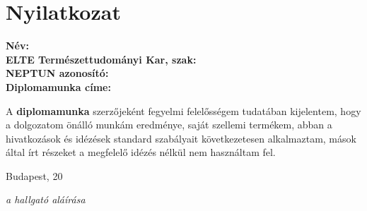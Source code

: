 \documentclass[a4paper,12pt]{report}
\begin{document}
\chapter*{Nyilatkozat}
\thispagestyle{empty}
\textbf{Név:\\ELTE Természettudományi Kar, szak:\\NEPTUN azonosító:\\Diplomamunka címe:}

\vspace{60pt}
A \textbf{diplomamunka} szerzőjeként fegyelmi felelősségem tudatában kijelentem, hogy a dolgozatom önálló munkám eredménye, saját szellemi termékem, abban a hivatkozások és idézések standard szabályait következetesen alkalmaztam, mások által írt részeket a megfelelő idézés nélkül nem használtam fel.


\vspace{30pt}
Budapest, 20\hfill\makebox[2.5in]{\hrulefill} \begin{flushright}\textit{a hallgató aláírása}\end{flushright}
\end{document}
